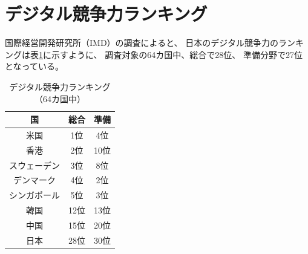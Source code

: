 \documentclass[a4paper,11pt,dvipdfmx]{ujarticle}
\begin{document}
\section{デジタル競争力ランキング}

国際経営開発研究所（IMD）の調査\cite{imd}によると、
日本のデジタル競争力のランキングは表\ref{countrytable}に示すように、
調査対象の64カ国中、総合で28位、
準備分野で27位となっている。

\begin{table}[htbp]
    \centering
    \caption{デジタル競争力ランキング（64カ国中）}
    \label{countrytable}
    \begin{tabular}{|c|c|c|}
        \hline
         国 & 総合 & 準備 \\
         \hline
         米国 & 1位 & 4位 \\
         \hline
         香港 & 2位 & 10位 \\
         \hline
         スウェーデン & 3位 & 8位 \\
         \hline
         デンマーク & 4位 & 2位 \\
         \hline
         シンガポール & 5位 & 3位 \\
        \hline
        \hline
         韓国 & 12位 & 13位 \\
         \hline
         中国 & 15位 & 20位 \\
         \hline
         \hline
         日本 & 28位 & 30位 \\
         \hline
     \end{tabular}
\end{table}

\end{document}
